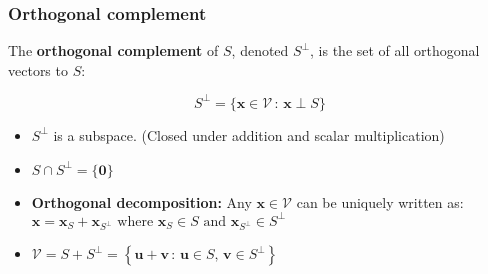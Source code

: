 \subsubsection{Orthogonal complement}
\begin{definition}
    The \textbf{orthogonal complement} of \( S \), denoted \( S^\perp \), is the set of all orthogonal vectors to \( S \):

    \[
    S^\perp = \{ \mathbf{x} \in \mathcal{V} \, : \, \mathbf{x} \perp S \}
    \]

    \begin{itemize}
        \item \( S^\perp \) is a subspace. (Closed under addition and scalar multiplication)
        
        \item \( S \cap S^\perp = \{ \mathbf{0} \} \)
        
        \item \textbf{Orthogonal decomposition:} Any \( \mathbf{x} \in \mathcal{V} \) can be uniquely written as: $\mathbf{x} = \mathbf{x}_S + \mathbf{x}_{S^\perp} \text{ where } \mathbf{x}_S \in S \text{ and } \mathbf{x}_{S^\perp} \in S^\perp$

        \item $\mathcal{V} = S + S^\perp = \left\{ \mathbf{u} + \mathbf{v} \, : \, \mathbf{u} \in S, \, \mathbf{v} \in S^\perp \right\}$
        
    \end{itemize}
\end{definition}